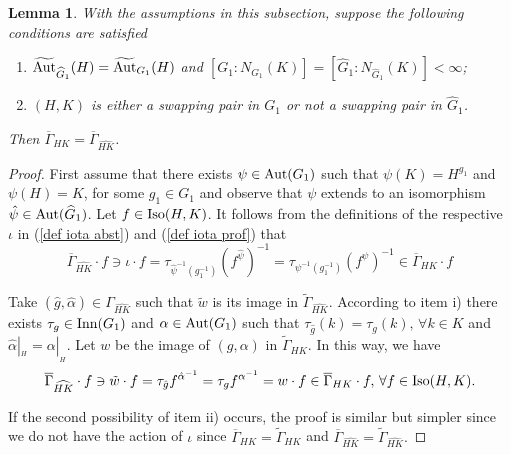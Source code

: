 \documentclass[a4paper,12pt]{article}
\newtheorem{lem}[thm]{Lemma}
\def\aut {{\rm Aut}}
\def\inn {{\rm Inn}}
\def\Iso {{\rm Iso}}
\begin{document}
{\begin{lem} \label{orbits non conjugated}
With the assumptions in this subsection, suppose the following conditions are satisfied 

\begin{enumerate}
    \item [i)]  $\widetilde{\aut}_{\widehat{G}_1}(H)=\widetilde{\aut}_{G_1}(H)$ and $[G_1:N_{G_1}(K)]=[\widehat G_1:N_{\widehat G_1}(K)]<\infty$; 
    
    \item [ii)] $(H,K)$ is either a swapping pair in  $G_1$ or not a swapping pair in $\widehat G_1$. 
\end{enumerate}
Then $\overline{\Gamma}_{HK}=\overline{\Gamma}_{\widehat{HK}}$. 
\end{lem}
\begin{proof}
First assume that there exists $\psi \in \aut(G_1)$ such that $\psi(K)=H^{g_1}$ and $\psi(H)=K$, for some $g_1\in G_1$ and observe that $\psi$ extends to an isomorphism $\hat\psi\in \aut(\widehat G_1)$.  Let $f \in \Iso(H, K)$. It follows from the definitions of the respective $\iota$ in (\ref{def iota abst}) and (\ref{def iota prof})  that 
$$\overline{\Gamma}_{\widehat{HK}}\cdot f\ni \iota\cdot f =\tau_{\hat\psi^{-1}(g_1^{-1})} \left(f^{\hat\psi}\right)^{-1}=\tau_{\psi^{-1}(g_1^{-1})} \left(f^{\psi}\right)^{-1}\in \overline{\Gamma}_{HK}\cdot f$$

Take $(\hat{g}, \hat{\alpha}) \in \Gamma_{\widehat{HK}}$ such that $\tilde{w}$ is its image in $\widetilde{\Gamma}_{\widehat{HK}}.$ 
According to item i) %
there exists $\tau_g \in \inn(G_1)$ and $\alpha \in \aut(G_1)$ such that $\tau_{\hat{g}}(k)=\tau_{g}(k), \, \forall k \in K$ and $\hat \alpha|_{_{H}} = \alpha|_{_{H}}$. Let $w$ be the image of $(g, \alpha)$ in $\widetilde{\Gamma}_{HK}.$ In this way, we have  $$\overline{\Gamma}_{\widehat{HK}}\cdot f\ni \tilde{w} \cdot f = \tau_{\hat g} f^{\hat{\alpha}^{-1}} = \tau_{ g} f^{\alpha^{-1}} =  w \cdot f\in \overline{\Gamma}_{HK}\cdot f,\, \forall f \in \Iso(H, K).$$

If the second possibility of item ii) occurs, the proof is similar but simpler since we do not have the action of $\iota$ since $\overline{\Gamma}_{HK}=\widetilde{\Gamma}_{HK}$ and $\overline{\Gamma}_{\widehat{HK}}=\widetilde{\Gamma}_{\widehat{HK}}.$
    
\end{proof}

}
\end{document}
